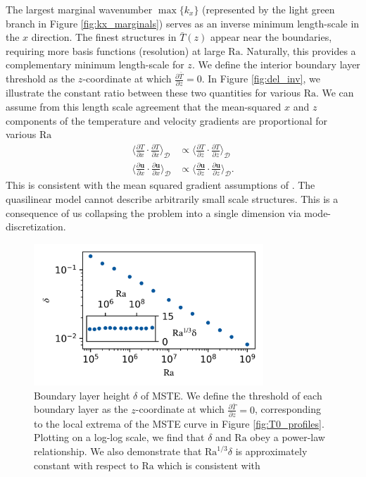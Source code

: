 \documentclass[reprint,amsmath,amssymb,aps]{revtex4-1}
\newcommand\Ra{\mathrm{Ra}}
\begin{document}
The largest marginal wavenumber $\max \{ k_x \}$ (represented by the light green branch in Figure \ref{fig:kx_marginals}) serves as an inverse minimum length-scale in the $x$ direction. The finest structures in $\bar{T}(z)$ appear near the boundaries, requiring more basis functions (resolution) at large $\Ra$. Naturally, this provides a complementary minimum length-scale for $z$. We define the interior boundary layer threshold as the $z$-coordinate at which $\frac{\partial \bar{T}}{\partial z} = 0$. In Figure \ref{fig:del_inv}, we illustrate the constant ratio between these two quantities for various $\Ra$. We can assume from this length scale agreement that the mean-squared $x$ and $z$ components of the temperature and velocity gradients are proportional for various $\Ra$
\begin{align*}
    \Big\langle \frac{\partial T}{\partial x} \cdot \frac{\partial T}{\partial x} \Big\rangle_{\mathcal{D}} &\propto \Big\langle \frac{\partial T}{\partial z} \cdot \frac{\partial T}{\partial z} \Big\rangle_{\mathcal{D}}    \\
    \Big\langle \frac{\partial \mathbf{u}}{\partial x} \cdot \frac{\partial \mathbf{u}}{\partial x} \Big\rangle_{\mathcal{D}} &\propto \Big\langle \frac{\partial \mathbf{u}}{\partial z} \cdot \frac{\partial \mathbf{u}}{\partial z} \Big\rangle_{\mathcal{D}}.
\end{align*}
This is consistent with the mean squared gradient assumptions of \cite{Malkus_1954}.
The quasilinear model cannot describe arbitrarily small scale structures. This is a consequence of us collapsing the problem into a single dimension via mode-discretization.

\begin{figure}
    \centering
    \includegraphics[width=3.4in]{del_ra.PNG}
    \caption{Boundary layer height $\delta$ of MSTE. 
    We define the threshold of each boundary layer as the $z$-coordinate at which $\frac{\partial \bar{T}}{\partial z} = 0$, corresponding to the local extrema of the MSTE curve in Figure \ref{fig:T0_profiles}. 
    Plotting on a log-log scale, we find that $\delta$ and $\Ra$ obey a power-law relationship. We also demonstrate that $\Ra^{1/3}\delta$ is approximately constant with respect to $\Ra$ which is consistent with \cite{Malkus_1954}}
    \label{fig:bl_ra}
\end{figure}
\end{document}
